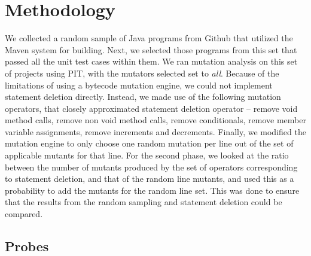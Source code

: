 \section{Methodology}
\label{sec:methodology}
We collected a random sample of Java programs from Github\cite{github} that utilized the Maven\cite{maven} system for building. Next, we selected those programs from this set that passed all the unit test cases within them. We ran mutation analysis on this set of projects using PIT\cite{pitest}, with the mutators selected set to {\it all}. Because of the limitations of using a bytecode mutation engine, we could not implement statement deletion directly. Instead, we made use of the following mutation operators, that closely approximated statement deletion operator -- remove void method calls, remove non void method calls, remove conditionals, remove member variable assignments, remove increments and decrements. Finally, we modified the mutation engine to only choose one random mutation per line out of the set of applicable mutants for that line. For the second phase, we looked at the ratio between the number of mutants produced by the set of operators corresponding to statement deletion, and that of the random line mutants, and used this as a probability to add the mutants for the random line set. This was done to ensure that the results from the random sampling and statement deletion could be compared.


\subsection{Probes}
